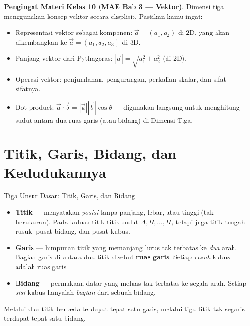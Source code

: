 \documentclass[11pt,a4paper]{report}
\theoremstyle{gaya}
\begin{document}
\begin{catatan}
\textbf{Pengingat Materi Kelas 10 (MAE Bab 3 --- Vektor).} Dimensi tiga menggunakan konsep vektor secara eksplisit. Pastikan kamu ingat:
\begin{itemize}[leftmargin=*,topsep=2pt]
  \item Representasi vektor sebagai komponen: $\vec a=(a_1,a_2)$ di 2D, yang akan dikembangkan ke $\vec a=(a_1,a_2,a_3)$ di 3D.
  \item Panjang vektor dari Pythagoras: $|\vec a|=\sqrt{a_1^2+a_2^2}$ (di 2D).
  \item Operasi vektor: penjumlahan, pengurangan, perkalian skalar, dan sifat-sifatnya.
  \item Dot product: $\vec a\cdot\vec b=|\vec a||\vec b|\cos\theta$ --- digunakan langsung untuk menghitung sudut antara dua ruas garis (atau bidang) di Dimensi Tiga.
\end{itemize}
\end{catatan}

\section{Titik, Garis, Bidang, dan Kedudukannya}
\begin{konsep}{Tiga Unsur Dasar: Titik, Garis, dan Bidang}
\begin{itemize}[leftmargin=*,topsep=2pt]
  \item \textbf{Titik} --- menyatakan \emph{posisi} tanpa panjang, lebar, atau tinggi (tak berukuran). Pada kubus: titik-titik sudut $A,B,\dots,H$, tetapi juga titik tengah rusuk, pusat bidang, dan pusat kubus.
  \item \textbf{Garis} --- himpunan titik yang memanjang lurus tak terbatas ke \emph{dua} arah. Bagian garis di antara dua titik disebut \textbf{ruas garis}. Setiap \emph{rusuk} kubus adalah ruas garis.
  \item \textbf{Bidang} --- permukaan datar yang meluas tak terbatas ke segala arah. Setiap \emph{sisi} kubus hanyalah \emph{bagian} dari sebuah bidang.
\end{itemize}
Melalui dua titik berbeda terdapat tepat satu garis; melalui tiga titik tak segaris terdapat tepat satu bidang.
\end{konsep}
\end{document}
